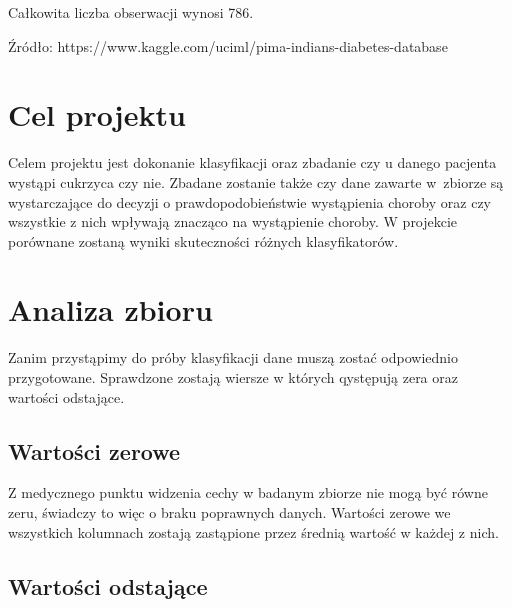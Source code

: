 \documentclass[12pt]{article}
\begin{document}
Całkowita liczba obserwacji wynosi 786.

Źródło: https://www.kaggle.com/uciml/pima-indians-diabetes-database


\pagebreak
\section{Cel projektu}

Celem projektu jest dokonanie klasyfikacji oraz zbadanie czy u danego pacjenta wystąpi cukrzyca czy nie. Zbadane zostanie także czy dane zawarte w~zbiorze są wystarczające do decyzji o prawdopodobieństwie wystąpienia choroby oraz czy wszystkie z nich wpływają znacząco na wystąpienie choroby.
W projekcie porównane zostaną wyniki skuteczności różnych klasyfikatorów.

\section{Analiza zbioru}

Zanim przystąpimy do próby klasyfikacji dane muszą zostać odpowiednio przygotowane. Sprawdzone zostają wiersze w których qystępują zera oraz wartości odstające.

\subsection{Wartości zerowe}

Z medycznego punktu widzenia cechy w badanym zbiorze nie mogą być równe zeru, świadczy to więc o braku poprawnych danych. Wartości zerowe we wszystkich kolumnach zostają zastąpione przez średnią wartość w każdej z nich. 

\subsection{Wartości odstające}
\end{document}
